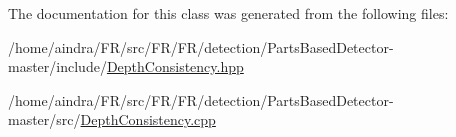 \-The documentation for this class was generated from the following files\-:\begin{DoxyCompactItemize}
\item 
/home/aindra/\-F\-R/src/\-F\-R/\-F\-R/detection/\-Parts\-Based\-Detector-\/master/include/\hyperlink{DepthConsistency_8hpp}{\-Depth\-Consistency.\-hpp}\item 
/home/aindra/\-F\-R/src/\-F\-R/\-F\-R/detection/\-Parts\-Based\-Detector-\/master/src/\hyperlink{DepthConsistency_8cpp}{\-Depth\-Consistency.\-cpp}\end{DoxyCompactItemize}
